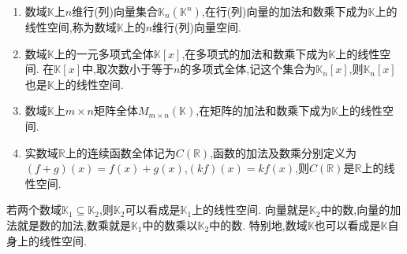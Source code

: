 \documentclass[lang=cn,newtx,10pt,scheme=chinese]{elegantbook}
\begin{document}
\begin{example}[$\,\,$常见的线性空间]\label{example:常见的线性空间}
\begin{enumerate}[(1)]
    \item 数域\(\mathbb{K}\)上\(n\)维行(列)向量集合\(\mathbb{K}_n(\mathbb{K}^n)\),在行(列)向量的加法和数乘下成为\(\mathbb{K}\)上的线性空间,称为数域\(\mathbb{K}\)上的\(n\)维行(列)向量空间.
    \item 数域\(\mathbb{K}\)上的一元多项式全体\(\mathbb{K}[x]\),在多项式的加法和数乘下成为\(\mathbb{K}\)上的线性空间. 在\(\mathbb{K}[x]\)中,取次数小于等于\(n\)的多项式全体,记这个集合为\(\mathbb{K}_n[x]\),则\(\mathbb{K}_n[x]\)也是\(\mathbb{K}\)上的线性空间.
    \item 数域\(\mathbb{K}\)上\(m\times n\)矩阵全体\(M_{m\times n}(\mathbb{K})\),在矩阵的加法和数乘下成为\(\mathbb{K}\)上的线性空间.
    \item \label{example:常见的线性空间(4)}实数域\(\mathbb{R}\)上的连续函数全体记为\(C(\mathbb{R})\),函数的加法及数乘分别定义为\((f + g)(x)=f(x)+g(x)\),\((kf)(x)=kf(x)\),则\(C(\mathbb{R})\)是\(\mathbb{R}\)上的线性空间.
\end{enumerate}
\end{example}

\begin{proposition}\label{proposition:数域上的线性空间}
    若两个数域\(\mathbb{K}_1\subseteq\mathbb{K}_2\),则\(\mathbb{K}_2\)可以看成是\(\mathbb{K}_1\)上的线性空间. 向量就是\(\mathbb{K}_2\)中的数,向量的加法就是数的加法,数乘就是\(\mathbb{K}_1\)中的数乘以\(\mathbb{K}_2\)中的数. 特别地,数域\(\mathbb{K}\)也可以看成是\(\mathbb{K}\)自身上的线性空间.
\end{proposition}
\end{document}
